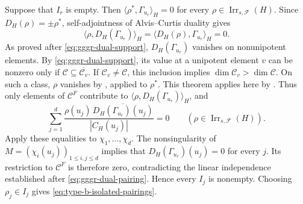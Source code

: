 \documentclass[10pt]{amsart}
\theoremstyle{definition}
\renewcommand{\leq}{\leqslant}
\let\oldendproof\endproof
\renewenvironment{proof}[1][\proofname]{%
  \oldproof[\bfseries #1]%
}{\oldendproof}
\DeclareMathOperator{\Irr}{Irr}
\numberwithin{equation}{section}
\numberwithin{table}{section}
\begin{document}
\begin{proof}[Proof of Lemma~\ref{lem:type-b-isolated-coverage}]
Suppose that $I_r$ is empty. Then $\langle\rho^*,\Gamma_{u_r}\rangle_H=0$
for every $\rho\in\Irr_{s,\mathcal F}(H)$.
Since $D_H(\rho)=\pm\rho^*$, self-adjointness of Alvis--Curtis duality gives
\[
 \langle\rho,D_H(\Gamma_{u_r})\rangle_H
 =\langle D_H(\rho),\Gamma_{u_r}\rangle_H=0.
\]
As proved after \eqref{eq:gggr-dual-support}, $D_H(\Gamma_{u_r})$ vanishes on
nonunipotent elements. By \eqref{eq:gggr-dual-support}, its value at a
unipotent element $v$ can be nonzero only if
$\mathcal C\subseteq\overline{\mathcal C_v}$.
If $\mathcal C_v\ne\mathcal C$, this inclusion implies
$\dim\mathcal C_v>\dim\mathcal C$.
On such a class, $\rho$ vanishes by \cite[Theorem~11.2(iv)]{Lusztig1992Support},
applied to $\rho^*$. This theorem applies here by
\cite[Corollary~13.6]{Taylor2016}.
Thus only elements of $\mathcal C^F$ contribute to
$\langle\rho,D_H(\Gamma_{u_r})\rangle_H$, and
\[
 \sum_{j=1}^{d}
 \frac{\rho(u_j)\,
       \overline{D_H(\Gamma_{u_r})(u_j)}}{|C_H(u_j)|}=0
 \qquad(\rho\in\Irr_{s,\mathcal F}(H)).
\]
Apply these equalities to $\chi_1,\ldots,\chi_d$.
The nonsingularity of $M=(\chi_i(u_j))_{1\leq i,j\leq d}$ implies that
$D_H(\Gamma_{u_r})(u_j)=0$ for every $j$.
Its restriction to $\mathcal C^F$ is therefore zero, contradicting the linear
independence established after \eqref{eq:gggr-dual-pairing}.
Hence every $I_j$ is nonempty. Choosing $\rho_j\in I_j$ gives
\eqref{eq:type-b-isolated-pairings}.
\end{proof}
\end{document}
